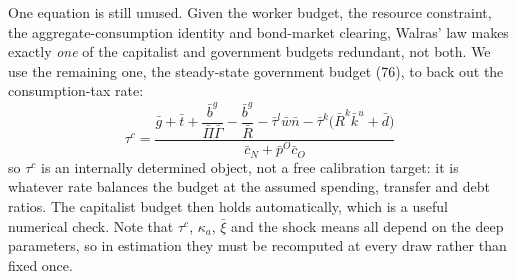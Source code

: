 \medskip\noindent
One equation is still unused. Given the worker budget, the resource constraint, the aggregate-consumption
identity and bond-market clearing, Walras' law makes exactly \emph{one} of the capitalist and government
budgets redundant, not both. We use the remaining one, the steady-state government budget (76), to back
out the consumption-tax rate:
\begin{equation}\label{eq:ss-tauc}
\boxed{\,\tau^c=\frac{\bar g+\bar t+\dfrac{\bar b^g}{\bar\Pi\bar\Gamma}-\dfrac{\bar b^g}{\bar R}
-\bar\tau^l\bar w\bar n-\bar\tau^k\big(\bar R^k\bar k^u+\bar d\big)}{\bar c_N+\bar p^O\bar c_O}\,}
\end{equation}
so $\tau^c$ is an internally determined object, not a free calibration target: it is whatever rate
balances the budget at the assumed spending, transfer and debt ratios. The capitalist budget then holds
automatically, which is a useful numerical check. Note that $\tau^c$, $\kappa_a$, $\bar\xi$ and the shock means
all depend on the deep parameters, so in estimation they must be recomputed at every draw rather than
fixed once.




